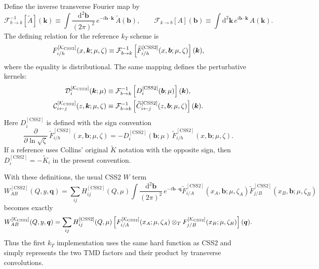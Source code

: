 \documentclass[11pt]{article}
\newcommand{\bk}{\bm{k}}
\newcommand{\bq}{\bm{q}}
\newcommand{\bb}{\bm{b}}
\newcommand{\dd}{\mathrm{d}}
\newcommand{\ot}{\otimes_T}
\newcommand{\KCSS}{\mathcal K_{\rm CSS2}}
\newcommand{\CSS}{\mathrm{CSS2}}
\begin{document}
Define the inverse transverse Fourier map by
\begin{equation}
  \mathcal F^{-1}_{b\to k}[\widetilde A](\bk)
  \equiv
  \int \frac{\dd^2\bb}{(2\pi)^2}\,e^{-i\bb\cdot\bk}\,\widetilde A(\bb),
  \qquad
  \mathcal F_{k\to b}[A](\bb)
  \equiv
  \int \dd^2\bk\,e^{i\bb\cdot\bk}\,A(\bk).
  \label{eq:Fourier-map}
\end{equation}
The defining relation for the reference $k_T$ scheme is
\begin{equation}
  F^{[\KCSS]}_{i/h}(x,\bk;\mu,\zeta)
  \equiv
  \mathcal F^{-1}_{b\to k}
  \left[
    \widetilde F^{[\CSS]}_{i/h}(x,\bb;\mu,\zeta)
  \right](\bk),
  \label{eq:KCSS-TMD-def}
\end{equation}
where the equality is distributional. The same mapping defines the perturbative kernels:
\begin{align}
  \mathcal D_i^{[\KCSS]}(\bk;\mu)
  &\equiv
  \mathcal F^{-1}_{b\to k}
  \left[D_i^{[\CSS]}(\bb;\mu)\right](\bk),
  \label{eq:KCSS-D-def}
  \\
  \mathcal C_{i\leftarrow j}^{[\KCSS]}(z,\bk;\mu,\zeta)
  &\equiv
  \mathcal F^{-1}_{b\to k}
  \left[\widetilde C_{i\leftarrow j}^{[\CSS]}(z,\bb;\mu,\zeta)\right](\bk).
  \label{eq:KCSS-C-def}
\end{align}
Here $D_i^{[\CSS]}$ is defined with the sign convention
\begin{equation}
  \frac{\partial}{\partial\ln\sqrt\zeta}\,
  \widetilde F^{[\CSS]}_{i/h}(x,\bb;\mu,\zeta)
  =
  -D_i^{[\CSS]}(\bb;\mu)\,
  \widetilde F^{[\CSS]}_{i/h}(x,\bb;\mu,\zeta).
  \label{eq:D-sign-convention}
\end{equation}
If a reference uses Collins' original $\widetilde K$ notation with the opposite sign, then
$D_i^{[\CSS]}=-\widetilde K_i$ in the present convention.

With these definitions, the usual CSS2 $W$ term
\begin{equation}
  W_{AB}^{[\CSS]}(Q,y,\bq)
  =
  \sum_{ij}H_{ij}^{[\CSS]}(Q,\mu)
  \int\frac{\dd^2\bb}{(2\pi)^2}\,e^{-i\bb\cdot\bq}
  \widetilde F_{i/A}^{[\CSS]}(x_A,\bb;\mu,\zeta_A)
  \widetilde F_{j/B}^{[\CSS]}(x_B,\bb;\mu,\zeta_B)
  \label{eq:W-CSS2-bspace}
\end{equation}
becomes exactly
\begin{equation}
  W_{AB}^{[\KCSS]}(Q,y,\bq)
  =
  \sum_{ij}H_{ij}^{[\CSS]}(Q,\mu)
  \left[
    F_{i/A}^{[\KCSS]}(x_A;\mu,\zeta_A)
    \ot
    F_{j/B}^{[\KCSS]}(x_B;\mu,\zeta_B)
  \right](\bq).
  \label{eq:W-KCSS-kspace}
\end{equation}
Thus the first $k_T$ implementation uses the same hard function as CSS2 and simply
represents the two TMD factors and their product by transverse convolutions.
\end{document}
